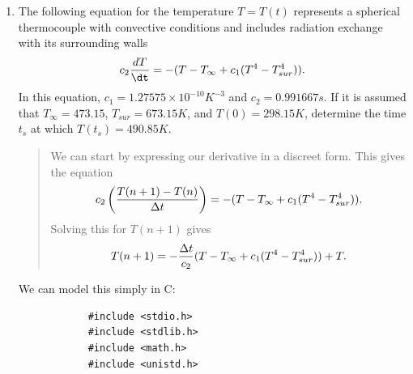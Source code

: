 \documentclass{hw}
\begin{document}
\begin{enumerate}
	\item The following equation for the temperature $T=T(t)$ represents a spherical thermocouple with
	      convective conditions and includes radiation exchange with its surrounding walls
	      \[
	      	c_{2}{dT\over\dt}=-(T-T_{\infty}+c_{1}(T^{4}-T^{4}_{sur})).
	      \]
	      In this equation, $c_{1}=1.27575\times10^{-10}K^{-3}$ and $c_{2}=0.991667s$. If it is assumed that
	      $T_{\infty}=473.15$, $T_{sur}=673.15K$, and $T(0)=298.15K$, determine the time $t_{s}$ at which
	      $T(t_{s})=490.85K$.
	      \begin{quote}
	      	We can start by expressing our derivative in a discreet form. This gives the equation
	      	\[
	      		c_{2}\left({T(n+1)-T(n)\over\Delta t}\right)=-(T-T_{\infty}+c_{1}(T^{4}-T^{4}_{sur})).
	      	\]
	      	Solving this for $T(n+1)$ gives
	      	\[
	      		T(n+1)=-{\Delta t\over c_{2}}(T-T_{\infty}+c_{1}(T^{4}-T^{4}_{sur})) + T.
	      	\]
	      \end{quote}
	      We can model this simply in C:

	      \begin{verbatim}
	      	#include <stdio.h>
	      	#include <stdlib.h>
	      	#include <math.h>
	      	#include <unistd.h>


\end{verbatim}
\end{enumerate}
\end{document}
